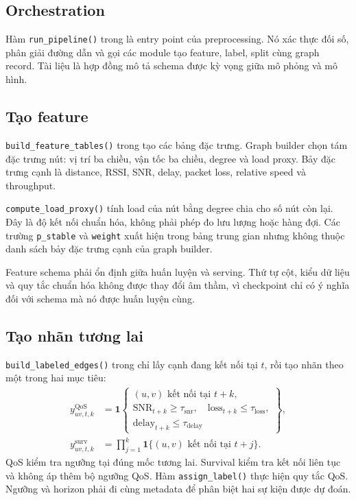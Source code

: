 \documentclass[12pt,a4paper]{article}
\newcommand{\code}[1]{{\small\texttt{#1}}}
\begin{document}
\subsection{Orchestration}

Hàm \code{run\_pipeline()} trong  là entry point của preprocessing. Nó xác thực đối số, phân giải đường dẫn và gọi các module tạo feature, label, split cùng graph record. Tài liệu  là hợp đồng mô tả schema được kỳ vọng giữa mô phỏng và mô hình.

\subsection{Tạo feature}

\code{build\_feature\_tables()} trong  tạo các bảng đặc trưng. Graph builder chọn tám đặc trưng nút: vị trí ba chiều, vận tốc ba chiều, degree và load proxy. Bảy đặc trưng cạnh là distance, RSSI, SNR, delay, packet loss, relative speed và throughput.

\code{compute\_load\_proxy()} tính load của nút bằng degree chia cho số nút còn lại. Đây là độ kết nối chuẩn hóa, không phải phép đo lưu lượng hoặc hàng đợi. Các trường \code{p\_stable} và \code{weight} xuất hiện trong bảng trung gian nhưng không thuộc danh sách bảy đặc trưng cạnh của graph builder.

Feature schema phải ổn định giữa huấn luyện và serving. Thứ tự cột, kiểu dữ liệu và quy tắc chuẩn hóa không được thay đổi âm thầm, vì checkpoint chỉ có ý nghĩa đối với schema mà nó được huấn luyện cùng.

\subsection{Tạo nhãn tương lai}

\code{build\_labeled\_edges()} trong  chỉ lấy cạnh đang kết nối tại \(t\), rồi tạo nhãn theo một trong hai mục tiêu:
\begin{align}
 y^{\mathrm{QoS}}_{uv,t,k}
 &= \mathbf{1}\!\left\{\begin{array}{l}
 (u,v)\text{ kết nối tại }t+k,\\
 \mathrm{SNR}_{t+k}\geq\tau_{\mathrm{snr}},\quad
 \mathrm{loss}_{t+k}\leq\tau_{\mathrm{loss}},\\
 \mathrm{delay}_{t+k}\leq\tau_{\mathrm{delay}}
 \end{array}\right\},\label{eq:qos-label}\\
 y^{\mathrm{surv}}_{uv,t,k}
 &= \prod_{j=1}^{k}\mathbf{1}\{(u,v)\text{ kết nối tại }t+j\}.
 \label{eq:survival-label}
\end{align}
QoS kiểm tra ngưỡng tại đúng mốc tương lai. Survival kiểm tra kết nối liên tục và không áp thêm bộ ngưỡng QoS. Hàm \code{assign\_label()} thực hiện quy tắc QoS. Ngưỡng và horizon phải đi cùng metadata để phân biệt hai sự kiện được dự đoán.
\end{document}
